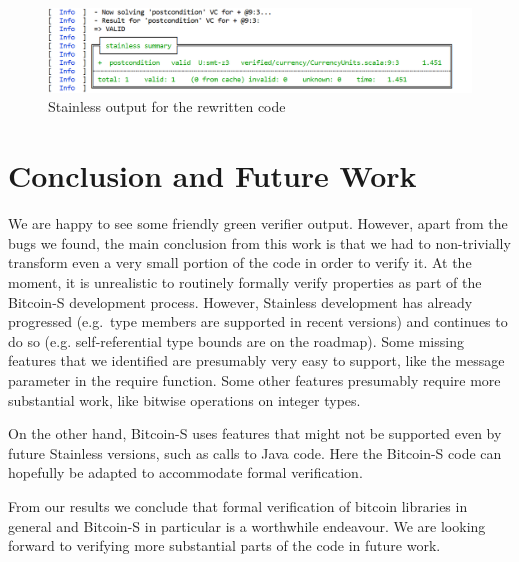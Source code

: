 \documentclass[hyphens, a4paper,USenglish,cleveref, autoref, thm-restate]{oasics-v2019}
\begin{document}
\begin{figure}
	\centering
		\includegraphics[width=\textwidth]{result_output}
	\caption{Stainless output for the rewritten code}
  \label{fig:result}
\end{figure}


\section{Conclusion and Future Work}

We are happy to see some friendly green verifier output. However,
apart from the bugs we found, the main conclusion from this work is
that we had to non-trivially transform even a very small portion of
the code in order to verify it. At the moment, it is unrealistic to
routinely formally verify properties as part of the Bitcoin-S
development process. However, Stainless development has already
progressed (e.g.\ type members are supported in recent versions) and
continues to do so (e.g. self-referential type bounds are on the
roadmap). Some missing features that we identified are presumably very
easy to support, like the message parameter in the require
function. Some other features presumably require more substantial
work, like bitwise operations on integer types.

On the other hand, Bitcoin-S uses features that might not be supported
even by future Stainless versions, such as calls to Java code. Here
the Bitcoin-S code can hopefully be adapted to accommodate formal
verification.

From our results we conclude that formal verification of bitcoin
libraries in general and Bitcoin-S in particular is a worthwhile
endeavour. We are looking forward to verifying more substantial parts
of the code in future work.

\appendix


\end{document}
